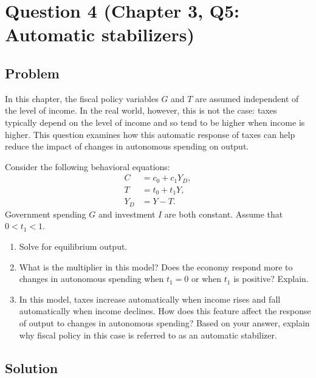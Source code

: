 \documentclass[12pt]{article}
\begin{document}
\bigskip


\newpage

\section*{Question 4 (Chapter 3, Q5: Automatic stabilizers)}

\subsection*{Problem}

In this chapter, the fiscal policy variables \(G\) and \(T\) are assumed independent of the level of income. In the real world, however, this is not the case: taxes typically depend on the level of income and so tend to be higher when income is higher. This question examines how this automatic response of taxes can help reduce the impact of changes in autonomous spending on output.

\medskip

Consider the following behavioral equations:
\begin{align*}
C &= c_0 + c_1Y_D,\\
T &= t_0 + t_1Y,\\
Y_D &= Y - T.
\end{align*}
Government spending \(G\) and investment \(I\) are both constant. Assume that \(0 < t_1 < 1\).

\begin{enumerate}[label=(\alph*)]
\item Solve for equilibrium output.
\item What is the multiplier in this model? Does the economy respond more to changes in autonomous spending when \(t_1 = 0\) or when \(t_1\) is positive? Explain.
\item In this model, taxes increase automatically when income rises and fall automatically when income declines. How does this feature affect the response of output to changes in autonomous spending? Based on your answer, explain why fiscal policy in this case is referred to as an automatic stabilizer.
\end{enumerate}

\subsection*{Solution}
\end{document}
